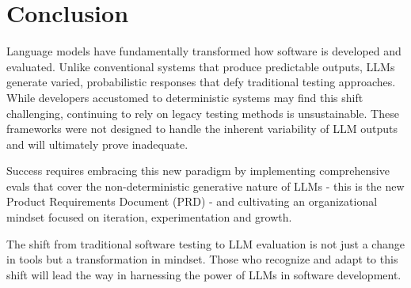 \section{Conclusion}

Language models have fundamentally transformed how software is developed and evaluated. Unlike conventional systems that produce predictable outputs, LLMs generate varied, probabilistic responses that defy traditional testing approaches. While developers accustomed to deterministic systems may find this shift challenging, continuing to rely on legacy testing methods is unsustainable. These frameworks were not designed to handle the inherent variability of LLM outputs and will ultimately prove inadequate.

Success requires embracing this new paradigm by implementing comprehensive evals that cover the non-deterministic generative nature of LLMs - this is the new Product Requirements Document (PRD) - and cultivating an organizational mindset focused on iteration, experimentation and growth.

The shift from traditional software testing to LLM evaluation is not just a change in tools but a transformation in mindset. Those who recognize and adapt to this shift will lead the way in harnessing the power of LLMs in software development.
